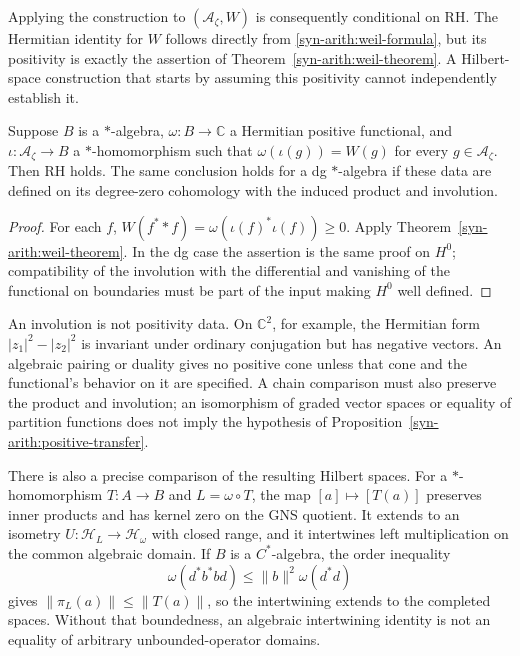 Applying the construction to $(\mathcal A_\zeta,W)$ is consequently
conditional on RH.  The Hermitian identity for $W$ follows directly from
\eqref{syn-arith:weil-formula}, but its positivity is exactly the assertion
of Theorem~\ref{syn-arith:weil-theorem}.  A Hilbert-space construction that
starts by assuming this positivity cannot independently establish it.

\begin{proposition}
\label{syn-arith:positive-transfer}
Suppose $B$ is a $*$-algebra, $\omega:B\to\mathbb C$ a Hermitian positive
functional, and $\iota:\mathcal A_\zeta\to B$ a $*$-homomorphism such that
$\omega(\iota(g))=W(g)$ for every $g\in\mathcal A_\zeta$.
Then RH holds.
The same conclusion holds for a dg $*$-algebra if these data are defined
on its degree-zero cohomology with the induced product and involution.
\end{proposition}
\begin{proof}
For each $f$,
$W(f^**f)=\omega(\iota(f)^*\iota(f))\geq0$.
Apply Theorem~\ref{syn-arith:weil-theorem}.
In the dg case the assertion is the same proof on $H^0$; compatibility of
the involution with the differential and vanishing of the functional on
boundaries must be part of the input making $H^0$ well defined.
\end{proof}

An involution is not positivity data.  On $\mathbb C^2$, for example,
the Hermitian form $|z_1|^2-|z_2|^2$ is invariant under ordinary conjugation
but has negative vectors.  An algebraic pairing or duality gives no positive
cone unless that cone and the functional's behavior on it are specified.
A chain comparison must also preserve the product and involution; an
isomorphism of graded vector spaces or equality of partition functions
does not imply the hypothesis of Proposition~\ref{syn-arith:positive-transfer}.

There is also a precise comparison of the resulting Hilbert spaces.
For a $*$-homomorphism $T:A\to B$ and $L=\omega\circ T$, the map
$[a]\mapsto[T(a)]$ preserves inner products and has kernel zero on the GNS
quotient.  It extends to an isometry $U:\mathcal H_L\to\mathcal H_\omega$
with closed range, and it intertwines left multiplication on the common
algebraic domain.  If $B$ is a $C^*$-algebra, the order inequality
\[
 \omega(d^*b^*bd)\leq\|b\|^2\omega(d^*d)
\]
gives $\|\pi_L(a)\|\leq\|T(a)\|$, so the intertwining extends to the
completed spaces.  Without that boundedness, an algebraic intertwining
identity is not an equality of arbitrary unbounded-operator domains.

